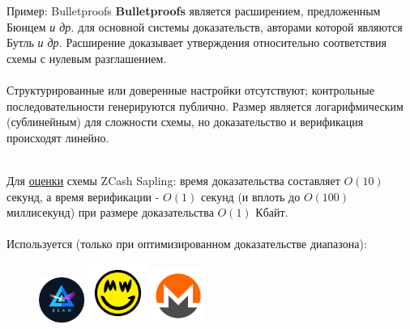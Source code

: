 \documentclass[aspectratio=169]{beamer}
\begin{document}
\begin{frame}{Пример: Bulletproofs}
\textbf{Bulletproofs} является расширением, предложенным Бюнцем \textit{и др.} для основной системы доказательств, авторами которой являются Бутль \textit{и др.} Расширение доказывает утверждения относительно соответствия схемы с нулевым разглашением. \\~\\

Структурированные или доверенные настройки отсутствуют; контрольные последовательности генерируются публично. Размер является логарифмическим (сублинейным) для сложности схемы, но доказательство и верификация происходят линейно. \\~\\
\end{frame}
\begin{frame}
Для \underline{оценки} схемы ZCash Sapling: время доказательства составляет $O(10)$ секунд, а время верификации - $O(1)$ секунд (и вплоть до $O(100)$ миллисекунд) при размере доказательства $O(1)$ Кбайт. \\~\\

Используется (только при оптимизированном доказательстве диапазона):
\begin{figure}
\includegraphics[align=c,height=42pt]{logo-beam.png}
\includegraphics[align=c,height=55pt]{logo-grin.png}
\includegraphics[align=c,height=50pt]{logo-monero.png}
\end{figure}
\end{frame}
\end{document}

